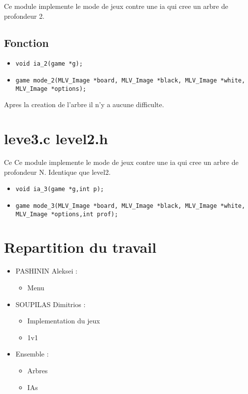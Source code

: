 \documentclass[11pt,a4paper]{article}
\begin{document}
Ce module implemente le mode de jeux contre une ia qui cree un arbre de profondeur 2.
\subsection{Fonction}


\begin{itemize}

\item \texttt{void ia\_2(game *g);}
\item \texttt{game mode\_2(MLV\_Image *board, MLV\_Image *black, MLV\_Image *white, MLV\_Image *options);}

\end{itemize}

Apres la creation de l'arbre il n'y a aucune difficulte.
\newpage
\section{leve3.c level2.h}
Ce Ce module implemente le mode de jeux contre une ia qui cree un arbre de profondeur N.
Identique que level2.

\begin{itemize}

\item \texttt{void ia\_3(game *g,int p);}
\item \texttt{game mode\_3(MLV\_Image *board, MLV\_Image *black, MLV\_Image *white, MLV\_Image *options,int prof);}

\end{itemize}

\section{Repartition du travail}
\begin{itemize}
\item PASHININ Aleksei :
  \begin{itemize}
  \item Menu
  \end{itemize}
\item SOUPILAS Dimitrios :
  \begin{itemize}
  \item Implementation du jeux
  \item 1v1
  \end{itemize}
\item Ensemble :
  \begin{itemize}
  \item Arbres
  \item IAs
  \end{itemize}
\end{itemize}




  
\end{document}
